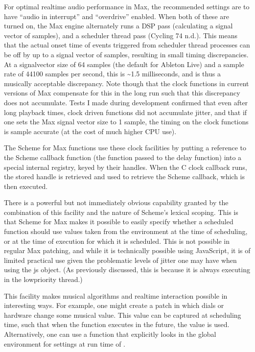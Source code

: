 \documentclass[letterpaper,10pt,english]{sphinxmanual}
\begin{document}
\sphinxAtStartPar
For optimal real\sphinxhyphen{}time audio performance in Max, the recommended
settings are to have “audio in interrupt” and “overdrive” enabled.
When both of these are turned on, the Max engine alternately runs
a DSP pass (calculating a signal vector of samples), and a scheduler
thread pass (Cycling 74 n.d.).
This means that the actual onset time of events triggered from
scheduler thread processes can be off by up to a signal
vector of samples, resulting in small timing discrepancies.
At a signal\sphinxhyphen{}vector size of 64 samples (the default for Ableton Live) and
a sample rate of 44100 samples per second, this is \textasciitilde{}1.5 milliseconds,
and is thus a musically acceptable discrepancy.
Note though that the clock functions
in current versions of Max compensate for this in the long run such
that this discrepancy does not accumulate.
Tests I made during development confirmed that even after long
playback times, clock driven functions did not accumulate jitter,
and that if one sets the Max signal vector size to 1 sample,
the timing on the clock functions is sample accurate (at the
cost of much higher CPU use).

\sphinxAtStartPar
The Scheme for Max functions use these clock facilities by putting
a reference to the Scheme callback function (the function passed to the delay function)
into a special internal registry, keyed by their handles.
When the C clock callback runs, the stored handle is retrieved
and used to retrieve the Scheme callback, which is then executed.

\sphinxAtStartPar
There is a powerful but not immediately obvious capability granted by
the combination of this facility
and the nature of Scheme’s lexical scoping. This is that
Scheme for Max makes it possible to easily specify whether
a scheduled function should use values taken
from the environment at the time of scheduling,
or at the time of execution for which it is scheduled.
This is not possible in regular Max patching, and while it is technically
possible using JavaScript, it is of limited practical use given the
problematic levels of jitter one may have when using the js object.
(As previously discussed, this is because it is always executing in the low\sphinxhyphen{}priority thread.)

\sphinxAtStartPar
This facility makes musical algorithms and real\sphinxhyphen{}time interaction possible in
interesting ways. For example, one might create a patch in which
dials or hardware change some musical value. This value can be captured
at scheduling time, such that when the function executes in the future,
the value  is used. Alternatively, one can
use a function that explicitly looks in the global environment
for settings at run time of .
\end{document}
